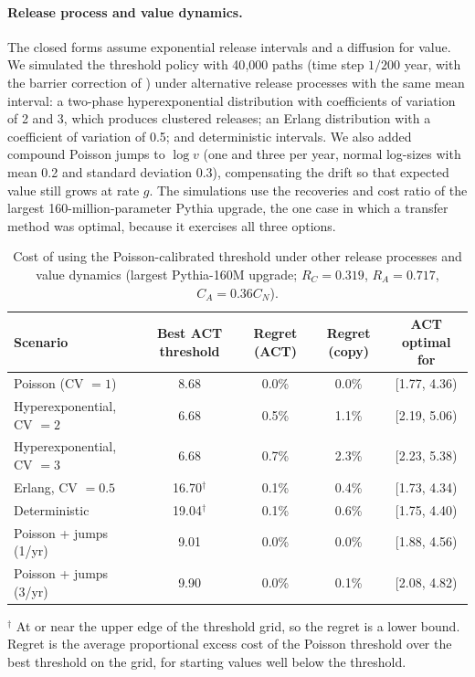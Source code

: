 \documentclass[ijds,blindrev]{informs4}
\begin{document}
\paragraph{Release process and value dynamics.} The closed forms assume exponential release intervals and a diffusion for value. We simulated the threshold policy with 40{,}000 paths (time step $1/200$ year, with the barrier correction of \citealt{broadie1997continuity}) under alternative release processes with the same mean interval: a two-phase hyperexponential distribution with coefficients of variation of 2 and 3, which produces clustered releases; an Erlang distribution with a coefficient of variation of 0.5; and deterministic intervals. We also added compound Poisson jumps to $\log v$ (one and three per year, normal log-sizes with mean 0.2 and standard deviation 0.3), compensating the drift so that expected value still grows at rate $g$. The simulations use the recoveries and cost ratio of the largest 160-million-parameter Pythia upgrade, the one case in which a transfer method was optimal, because it exercises all three options.

\begin{table}[t]
\centering
\caption{Cost of using the Poisson-calibrated threshold under other release processes and value dynamics (largest Pythia-160M upgrade; $R_C=0.319$, $R_A=0.717$, $C_A=0.36C_N$).}\label{tab:robust}
\small
\begin{tabular}{lcccc}
\toprule
Scenario & Best ACT threshold & Regret (ACT) & Regret (copy) & ACT optimal for\\
\midrule
Poisson (CV $=1$) & 8.68 & 0.0\% & 0.0\% & [1.77, 4.36)\\
Hyperexponential, CV $=2$ & 6.68 & 0.5\% & 1.1\% & [2.19, 5.06)\\
Hyperexponential, CV $=3$ & 6.68 & 0.7\% & 2.3\% & [2.23, 5.38)\\
Erlang, CV $=0.5$ & 16.70$^\dagger$ & 0.1\% & 0.4\% & [1.73, 4.34)\\
Deterministic & 19.04$^\dagger$ & 0.1\% & 0.6\% & [1.75, 4.40)\\
Poisson + jumps (1/yr) & 9.01 & 0.0\% & 0.0\% & [1.88, 4.56)\\
Poisson + jumps (3/yr) & 9.90 & 0.0\% & 0.1\% & [2.08, 4.82)\\
\bottomrule
\end{tabular}

\smallskip\footnotesize $^\dagger$ At or near the upper edge of the threshold grid, so the regret is a lower bound. Regret is the average proportional excess cost of the Poisson threshold over the best threshold on the grid, for starting values well below the threshold.
\end{table}
\end{document}
